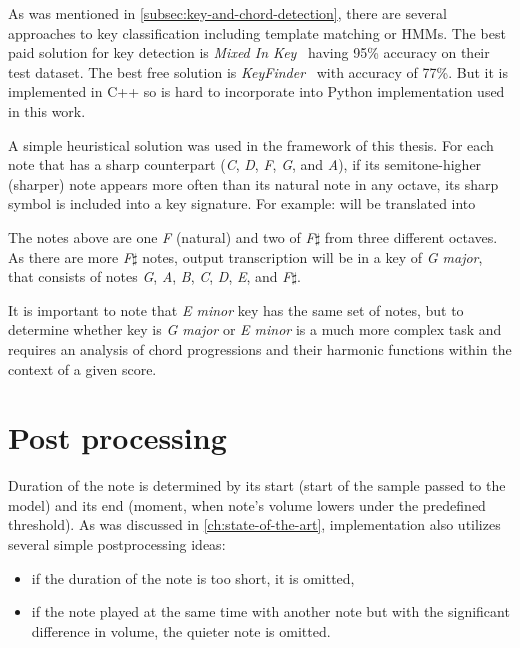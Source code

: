 As was mentioned in \cref{subsec:key-and-chord-detection}, there are several approaches to key classification including
template matching or \acp{HMM}. The best paid solution for key detection is \textit{Mixed In Key}~\cite{mixed-in-keys}
having 95\% accuracy on their test dataset. The best free solution is \textit{KeyFinder}~\cite{key-finder} with accuracy
of 77\%. But it is implemented in C++ so is hard to incorporate into Python implementation used in this work.

A simple heuristical solution was used in the framework of this thesis. For each note that has a sharp counterpart
(\textit{C}, \textit{D}, \textit{F}, \textit{G}, and \textit{A}), if its semitone-higher (sharper) note appears more
often than its natural note in any octave, its sharp symbol is included into a key signature. For example:
will be translated into

The notes above are one \textit{F} (natural) and two of \textit{F}$\sharp$ from three different octaves. As there are more
\textit{F}$\sharp$ notes, output transcription will be in a key of \textit{G major}, that consists of notes \textit{G},
\textit{A}, \textit{B}, \textit{C}, \textit{D}, \textit{E}, and \textit{F}$\sharp$.

It is important to note that \textit{E minor} key has the same set of notes, but to determine whether key is
\textit{G major} or \textit{E minor} is a much more complex task and requires an analysis of chord progressions and
their harmonic functions within the context of a given score.

\section{Post processing}\label{sec:post-processing}

Duration of the note is determined by its start (start of the sample passed to the model) and its end (moment, when
note's volume lowers under the predefined threshold). As was discussed in \cref{ch:state-of-the-art}, implementation
also utilizes several simple postprocessing ideas:
\begin{itemize}
	\item if the duration of the note is too short, it is omitted,
	\item if the note played at the same time with another note but with the significant difference in volume,
	the quieter note is omitted.
\end{itemize}

